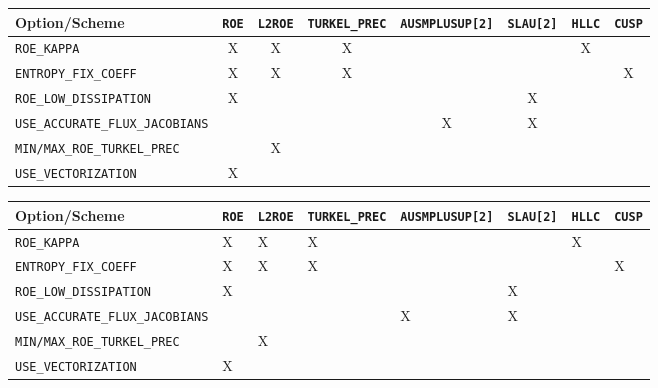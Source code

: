 \documentclass[12pt, a4paper, twoside]{article}
\begin{document}
\vspace{3 mm}
\begin{adjustbox}{width=\textwidth}
\begin{tabular}{ m{13em}  c c c c c c c }

    \textbf{Option/Scheme} & \texttt{ROE} & \verb|L2ROE| & \verb|TURKEL_PREC| & \verb|AUSMPLUSUP[2]| & \verb|SLAU[2]| & \texttt{HLLC} & \texttt{CUSP} \\ [0.5ex]
  \hline
  \hline
  \verb|ROE_KAPPA| & X & X & X & & & X & \\ [1ex]
  \hline
  \verb|ENTROPY_FIX_COEFF| & X & X & X & & & & X \\ [1ex]
  \hline
  \verb|ROE_LOW_DISSIPATION| & X & & & & X & & \\ [1ex]
  \hline
  \texttt{USE\_ACCURATE\_FLUX\_JACOBIANS} & & & & X & X & &\\ [1ex]
  \hline
  \texttt{MIN/MAX\_ROE\_TURKEL\_PREC} & & X & & & & & \\ [1ex]
  \hline
  \verb|USE_VECTORIZATION| & X & & & & & & \\ [1ex]
  \hline
  \hline
\end{tabular}
\end{adjustbox}


\iffalse

\begin{center}
\begin{tabular}{ m{12em}  m{1em} m{3em} m{6em}  m{7em} m{3em} m{2em}  m{2em} }
    \hline \hline
    \textbf{Option/Scheme} & \texttt{ROE} & \verb|L2ROE| & \verb|TURKEL_PREC| & \verb|AUSMPLUSUP[2]| & \verb|SLAU[2]| & \texttt{HLLC} & \texttt{CUSP} \\ [1ex]
  \hline
  \hline
  \verb|ROE_KAPPA| & X & X & X & & & X & \\ [1ex]
  \hline
  \verb|ENTROPY_FIX_COEFF| & X & X & X & & & & X \\ [1ex]
  \hline
  \verb|ROE_LOW_DISSIPATION| & X & & & & X & & \\ [1ex]
  \hline
  \verb|USE_ACCURATE_FLUX_JACOBIANS| & & & & X & X & &\\ [1ex]
  \hline
  \verb|MIN/MAX_ROE_TURKEL_PREC| & & X & & & & & \\ [1ex]
  \hline
  \verb|USE_VECTORIZATION| & X & & & & & & \\ [1ex]
  \hline
  \hline


\end{tabular}
\end{center}
\end{document}
